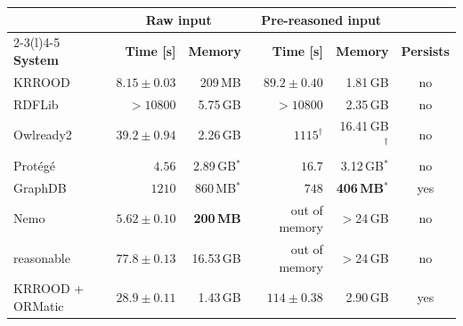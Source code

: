 \begin{tabular}{@{}lrrrrc@{}}
\toprule
 & \multicolumn{2}{c}{\textbf{Raw input}} & \multicolumn{2}{c}{\textbf{Pre-reasoned input}} & \\
\cmidrule(lr){2-3}\cmidrule(l){4-5}
\textbf{System} & \textbf{Time [s]} & \textbf{Memory} & \textbf{Time [s]} & \textbf{Memory} & \textbf{Persists}\\
\midrule
KRROOD & $8.15 \pm 0.03$ & 209\,MB & $89.2 \pm 0.40$ & 1.81\,GB & no\\
RDFLib & $>10800$ & 5.75\,GB & $>10800$ & 2.35\,GB & no\\
Owlready2 & $39.2 \pm 0.94$ & 2.26\,GB & $1115^{\dagger}$ & 16.41\,GB$^{\dagger}$ & no\\
Prot\'eg\'e & $\mathbf{4.56}$ & 2.89\,GB$^{\ast}$ & $\mathbf{16.7}$ & 3.12\,GB$^{\ast}$ & no\\
GraphDB & $1210$ & 860\,MB$^{\ast}$ & $748$ & \textbf{406\,MB$^{\ast}$} & yes\\
Nemo & $5.62 \pm 0.10$ & \textbf{200\,MB} & out of memory & $>$24\,GB & no\\
reasonable & $77.8 \pm 0.13$ & 16.53\,GB & out of memory & $>$24\,GB & no\\
KRROOD + ORMatic & $28.9 \pm 0.11$ & 1.43\,GB & $114 \pm 0.38$ & 2.90\,GB & yes\\
\bottomrule
\end{tabular}
